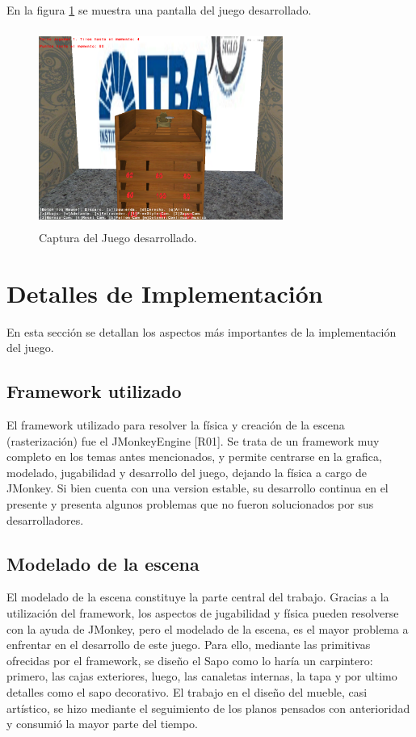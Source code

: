 \documentclass{acm_proc_article-sp}
\begin{document}
En la figura \ref{fig:sapoGame} se muestra una pantalla del juego desarrollado.

\begin{figure}[!ht]
	\centering
		\includegraphics[width=8cm,height=6.45cm]{img/simpleShoot.png}
	\caption{Captura del Juego desarrollado.}
	\label{fig:sapoGame}
\end{figure}


\section{Detalles de Implementaci\'on}
\label{sec:impl}

En esta secci\'on se detallan los aspectos m\'as importantes de la implementaci\'on del juego.
\subsection{Framework utilizado}

El framework utilizado para resolver la f\'isica y creaci\'on de la escena (rasterizaci\'on) fue el JMonkeyEngine [R01]. Se trata de un framework muy completo en los temas antes mencionados, y permite centrarse en la grafica, modelado, jugabilidad y desarrollo del juego, dejando la f\'isica a cargo de JMonkey. Si bien cuenta con una version estable, su desarrollo continua en el presente y presenta algunos problemas que no fueron solucionados por sus desarrolladores. 

\subsection{Modelado de la escena}

El modelado de la escena constituye la parte central del trabajo. Gracias a la utilizaci\'on del framework, los aspectos de jugabilidad y f\'isica pueden resolverse con la ayuda de JMonkey, pero el modelado de la escena, es el mayor problema a enfrentar en el desarrollo de este juego. 
Para ello, mediante las primitivas ofrecidas por el framework, se dise\~no el Sapo como lo har\'ia un carpintero: primero, las cajas exteriores, luego, las canaletas internas, la tapa y por ultimo detalles como el sapo decorativo. El trabajo en el dise\~no del mueble, casi art\'istico, se hizo mediante el seguimiento de los planos pensados con  anterioridad y consumi\'o la mayor parte del tiempo.
\end{document}
